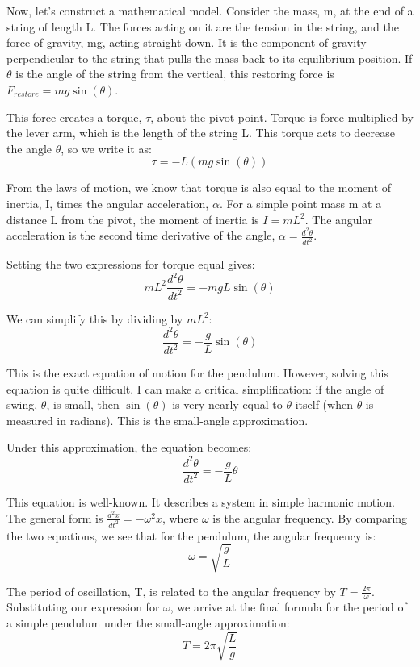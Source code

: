 \documentclass[12pt]{article}
\begin{document}
Now, let's construct a mathematical model. Consider the mass, m, at the end of a string of length L. The forces acting on it are the tension in the string, and the force of gravity, mg, acting straight down. It is the component of gravity perpendicular to the string that pulls the mass back to its equilibrium position. If \(\theta\) is the angle of the string from the vertical, this restoring force is \(F_{restore} = mg \sin(\theta)\).

This force creates a torque, \(\tau\), about the pivot point. Torque is force multiplied by the lever arm, which is the length of the string L. This torque acts to decrease the angle \(\theta\), so we write it as:
\[\tau = -L (mg \sin(\theta))\]

From the laws of motion, we know that torque is also equal to the moment of inertia, I, times the angular acceleration, \(\alpha\). For a simple point mass m at a distance L from the pivot, the moment of inertia is \(I = mL^2\). The angular acceleration is the second time derivative of the angle, \(\alpha = \frac{d^2\theta}{dt^2}\).

Setting the two expressions for torque equal gives:
\[mL^2 \frac{d^2\theta}{dt^2} = -mgL \sin(\theta)\]

We can simplify this by dividing by \(mL^2\):
\[\frac{d^2\theta}{dt^2} = -\frac{g}{L} \sin(\theta)\]

This is the exact equation of motion for the pendulum. However, solving this equation is quite difficult. I can make a critical simplification: if the angle of swing, \(\theta\), is small, then \(\sin(\theta)\) is very nearly equal to \(\theta\) itself (when \(\theta\) is measured in radians). This is the small-angle approximation.

Under this approximation, the equation becomes:
\[\frac{d^2\theta}{dt^2} = -\frac{g}{L} \theta\]

This equation is well-known. It describes a system in simple harmonic motion. The general form is \(\frac{d^2x}{dt^2} = -\omega^2 x\), where \(\omega\) is the angular frequency. By comparing the two equations, we see that for the pendulum, the angular frequency is:
\[\omega = \sqrt{\frac{g}{L}}\]

The period of oscillation, T, is related to the angular frequency by \(T = \frac{2\pi}{\omega}\). Substituting our expression for \(\omega\), we arrive at the final formula for the period of a simple pendulum under the small-angle approximation:
\[T = 2\pi \sqrt{\frac{L}{g}}\]
\end{document}
